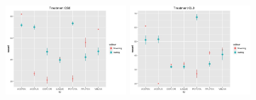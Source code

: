 \documentclass{article}\usepackage[]{graphicx}\usepackage[]{color}
\begin{document}
\includegraphics[width=4.5cm,height=4cm]{CS0}
\includegraphics[width=4.5cm,height=4cm]{CL0}
\end{document}
